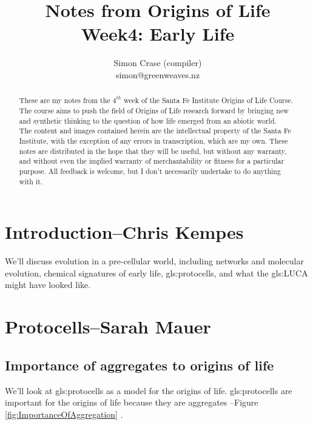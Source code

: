 \documentclass[]{article}
\title{Notes from Origins of Life\\Week4: Early Life}
\author{Simon Crase (compiler)\\simon@greenweaves.nz}
\begin{document}
\maketitle

\begin{abstract}
   These are my notes from the $4^{th}$ week of the Santa Fe Institute Origins of Life Course\cite{sfi2020}. The course aims to push the field of Origins of Life research forward by bringing new and synthetic thinking to the question of how life emerged from an abiotic world.\\
   The content and images contained herein are the intellectual property of the Santa Fe Institute, with the exception of any errors in transcription, which are my own.
   These notes are distributed in the hope that they will be useful,
   but without any warranty, and without even the implied warranty of
   merchantability or fitness for a particular purpose. All feedback is welcome,
   but I don't necessarily undertake to do anything with it.
\end{abstract}

\setcounter{tocdepth}{2}
\tableofcontents
\listoffigures
\section[Introduction]{Introduction--Chris Kempes}

We'll discuss evolution in a pre-cellular world, including  networks and molecular evolution, chemical signatures of early life, \glspl{gls:protocell}, and what the \gls{gls:LUCA} might have looked like.

\section[Protocells]{Protocells--Sarah Mauer}

\subsection{Importance of aggregates to origins of life}
We'll look at \glspl{gls:protocell} as a model for the origins of life. \glspl{gls:protocell} are important for the origins of life because they are aggregates --Figure \ref{fig:ImportanceOfAggregation} \cite{deamer2017role,maurer2011primitive,segre2001lipid}.
\end{document}
